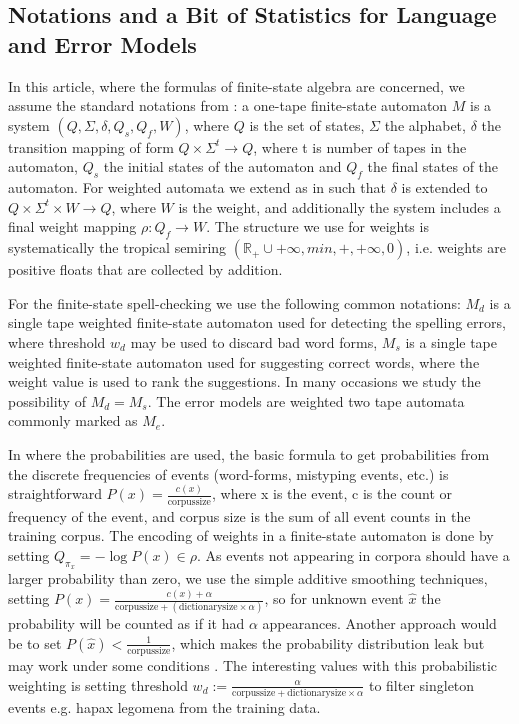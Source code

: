 \documentclass[a4paper,12pt]{article}
\begin{document}
\subsection{Notations and a Bit of Statistics for Language and Error Models}
\label{subsec:theory}

In this article, where the formulas of finite-state algebra are concerned, we
assume the standard notations from \cite{aho2007compilers}: a one-tape
finite-state automaton $M$ is a system $(Q, \Sigma, \delta, Q_s, Q_f, W)$,
where $Q$ is the set of states, $\Sigma$ the alphabet, $\delta$ the transition
mapping of form $Q \times \Sigma^t \rightarrow Q$, where t is number of tapes
in the automaton, $Q_s$ the initial states of the automaton and $Q_f$ the final
states of the automaton. For weighted automata we extend as in
\cite{mohri2009weighted} such that $\delta$ is extended to $Q \times \Sigma^t
\times W \rightarrow Q$, where $W$ is the weight, and additionally the system
includes a final weight mapping $\rho: Q_f \rightarrow W$. The structure we use
for weights is systematically the tropical semiring $(\mathbb{R}_+ \cup
{+\infty}, min, +, +\infty, 0)$, i.e. weights are positive floats that are
collected by addition.

For the finite-state spell-checking we use the following common notations:
$M_d$ is a single tape weighted finite-state automaton used for detecting the
spelling errors, where threshold $w_d$ may be used to discard bad word forms,
$M_s$ is a single tape weighted finite-state automaton used for suggesting
correct words, where the weight value is used to rank the suggestions.  In many
occasions we study the possibility of $M_d = M_s$. The error models are
weighted two tape automata commonly marked as $M_e$.

In where the probabilities are used, the basic formula to get probabilities
from the discrete frequencies of events (word-forms, mistyping events, etc.) is
straightforward $P(x) = \frac{c(x)}{\mathrm{corpus size}}$, where x is the
event, c is the count or frequency of the event, and corpus size is the sum of
all event counts in the training corpus. The encoding of weights in a
finite-state automaton is done by setting $Q_{\pi_x} = -\log P(x) \in \rho$.
As events not appearing in corpora should have a larger probability than zero,
we use the simple additive smoothing techniques, setting $P(x) = \frac{c(x) +
\alpha}{\mathrm{corpus size} + (\mathrm{dictionary size} \times \alpha)}$, so
for unknown event $\hat{x}$ the probability will be counted as if it had
$\alpha$ appearances.  Another approach would be to set $P(\hat{x}) <
\frac{1}{\mathrm{corpus size}}$, which makes the probability distribution leak
but may work under some conditions \cite[]{brants2007large}.  The interesting
values with this probabilistic weighting is setting threshold $w_d :=
\frac{\alpha}{\mathrm{corpus size} + \mathrm{dictionary size} \times \alpha}$
to filter singleton events e.g. hapax legomena from the training data.
\end{document}
